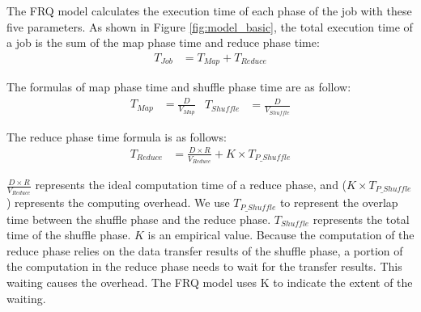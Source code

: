 {The FRQ model calculates the execution time of each phase of the job with these five parameters. As shown in Figure \ref{fig:model_basic}, the total execution time of a job is the sum of the map phase time and reduce phase time:
\begin{equation}
\label{equation_Tjob}
\begin{aligned}
    T_{Job} &= T_{Map} + T_{Reduce}
\end{aligned}
\end{equation}

The formulas of map phase time and shuffle phase time are as follow:
\begin{equation}
\label{equation_Tmap}
\begin{aligned}
    T_{Map} &= {{\frac{D}{V_{Map}}}}
\end{aligned}
\begin{aligned}
    T_{Shuffle} &= {{\frac{D}{V_{Shuffle}}}}
\end{aligned}
\end{equation}

The reduce phase time formula is as follows:
\begin{equation}
\label{equation_Treduce}
\begin{aligned}
    T_{Reduce} &= \frac{D \times R}{V_{Reduce}} + K \times T_{P\_Shuffle}
\end{aligned}
\end{equation}

\(\frac{D \times R}{V_{Reduce}}\) represents the ideal computation time of a reduce phase, and (\(K \times T_{P\_Shuffle}\)) represents the computing overhead.
We use \(T_{P\_Shuffle}\) to represent the overlap time between the shuffle phase and the reduce phase. \(T_{Shuffle}\) represents the total time of the shuffle phase. 
\(K\) is an empirical value. 
Because the computation of the reduce phase relies on the data transfer results of the shuffle phase, a portion of the computation in the reduce phase needs to wait for the transfer results. This waiting causes the overhead. The FRQ model uses K to indicate the extent of the waiting.


}
